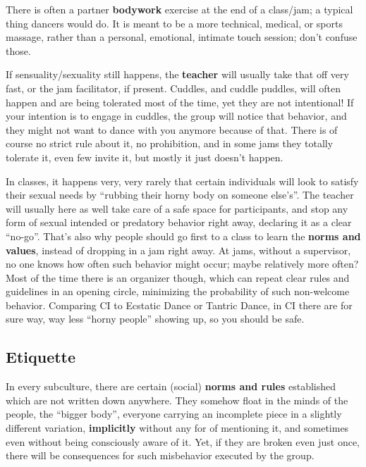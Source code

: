 There is often a partner \textbf{bodywork} exercise at the end of a class/jam; a typical thing dancers would do.
It is meant to be a more technical, medical, or sports massage, rather than a personal, emotional, intimate touch session; don't confuse those.

If sensuality/sexuality still happens, the \textbf{teacher} will usually take that off very fast, or the jam facilitator, if present.
Cuddles, and cuddle puddles, will often happen and are being tolerated most of the time, yet they are not intentional!
If your intention is to engage in cuddles, the group will notice that behavior, and they might not want to dance with you anymore because of that.
There is of course no strict rule about it, no prohibition, and in some jams they totally tolerate it, even few invite it, but mostly it just doesn't happen.

In classes, it happens very, very rarely that certain individuals will look to satisfy their sexual needs by ``rubbing their horny body on someone else's''.
The teacher will usually here as well take care of a safe space for participants, and stop any form of sexual intended or predatory behavior right away, declaring it as a clear ``no-go''.
That's also why people should go first to a class to learn the \textbf{norms and values}, instead of dropping in a jam right away.
At jams, without a supervisor, no one knows how often such behavior might occur; maybe relatively more often?
Most of the time there is an organizer though, which can repeat clear rules and guidelines in an opening circle, minimizing the probability of such non-welcome behavior.
Comparing CI to Ecstatic Dance or Tantric Dance, in CI there are for sure way, way less ``horny people'' showing up, so you should be safe.

\subsection{Etiquette}\label{subsec:etiquette}

In every subculture, there are certain (social) \textbf{norms and rules} established which are not written down anywhere.
They somehow float in the minds of the people, the ``bigger body'', everyone carrying an incomplete piece in a slightly different variation, \textbf{implicitly} without any for of mentioning it, and sometimes even without being consciously aware of it.
Yet, if they are broken even just once, there will be consequences for such misbehavior executed by the group.

